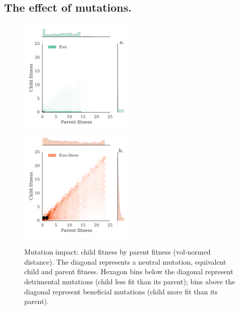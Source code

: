 \subsection{The effect of mutations.}

\begin{figure}
\centering
\includegraphics[width=0.495\textwidth]{Chapter03/img/mutations_gecco_evo_None}
\includegraphics[width=0.495\textwidth]{Chapter03/img/mutations_gecco_devo_None}
\caption{\label{fig:mutations} Mutation impact: child fitness by parent fitness (vol-normed distance). The diagonal represents a neutral mutation, equivalent child and parent fitness. Hexagon bins below the diagonal represent detrimental mutations (child less fit than its parent); bins above the diagonal represent beneficial mutations (child more fit than its parent).}
\end{figure}


